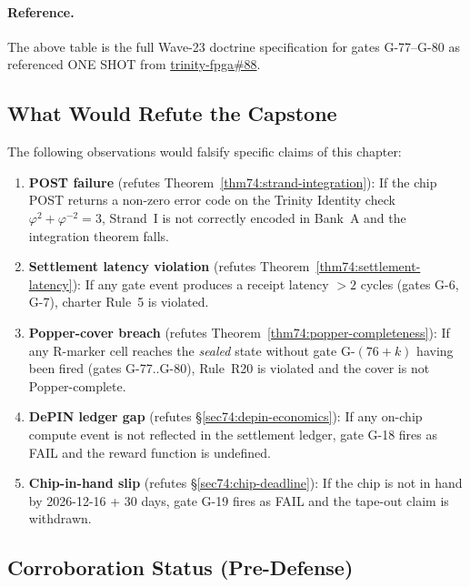 \paragraph{Reference.}
The above table is the full Wave-23 doctrine specification for gates
G-77--G-80 as referenced ONE SHOT from
\href{https://github.com/gHashTag/trinity-fpga/issues/88}{trinity-fpga\#88}.

\subsection{What Would Refute the Capstone}
\label{sec74:what-refutes}

The following observations would falsify specific claims of this chapter:

\begin{enumerate}
  \item \textbf{POST failure} (refutes Theorem~\ref{thm74:strand-integration}):
    If the chip POST returns a non-zero error code on the Trinity Identity
    check $\varphi^{2}+\varphi^{-2}=3$, Strand~I is not correctly encoded
    in Bank~A and the integration theorem falls.

  \item \textbf{Settlement latency violation} (refutes
    Theorem~\ref{thm74:settlement-latency}):
    If any gate event produces a receipt latency $> 2$ cycles (gates G-6,
    G-7), charter Rule~5 is violated.

  \item \textbf{Popper-cover breach} (refutes
    Theorem~\ref{thm74:popper-completeness}):
    If any R-marker cell reaches the \textit{sealed} state without gate
    G-$(76+k)$ having been fired (gates G-77..G-80), Rule~R20 is violated
    and the cover is not Popper-complete.

  \item \textbf{DePIN ledger gap} (refutes
    \S\ref{sec74:depin-economics}):
    If any on-chip compute event is not reflected in the settlement ledger,
    gate G-18 fires as FAIL and the reward function is undefined.

  \item \textbf{Chip-in-hand slip} (refutes \S\ref{sec74:chip-deadline}):
    If the chip is not in hand by 2026-12-16 + 30 days, gate G-19 fires as
    FAIL and the tape-out claim is withdrawn.
\end{enumerate}

\subsection{Corroboration Status (Pre-Defense)}
\label{sec74:corroboration-pre}

